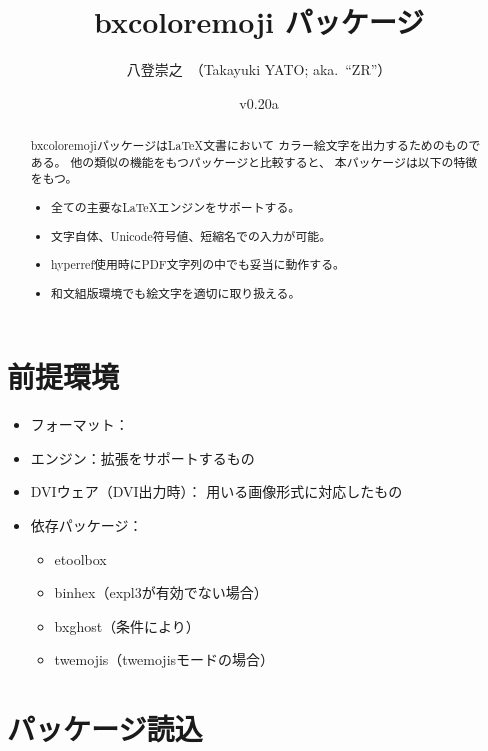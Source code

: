 \documentclass[a4paper]{ltjsarticle}
\newcommand{\PkgVersion}{0.20a}
\newcommand{\PkgDate}{2024/08/16}
\newcommand{\Pkg}[1]{\textsf{#1}}
\newcommand{\Means}{：\quad}
\newcommand{\／}{\mbox{}／\mbox{}}
\begin{document}
\title{\Pkg{bxcoloremoji} パッケージ}
\author{八登崇之\ （Takayuki YATO; aka.~“ZR”）}
\date{v\PkgVersion\quad[\PkgDate]}
\maketitle

\begin{abstract}
\Pkg{bxcoloremoji}パッケージは{\LaTeX}文書において
カラー絵文字を出力するためのものである。
他の類似の機能をもつパッケージと比較すると、
本パッケージは以下の特徴をもつ。
\begin{itemize}
\item 全ての主要な{\LaTeX}エンジンをサポートする。
\item 文字自体、Unicode符号値、短縮名での入力が可能。
\item \Pkg{hyperref}使用時にPDF文字列の中でも妥当に動作する。
\item 和文組版環境でも絵文字を適切に取り扱える。
\end{itemize}
\end{abstract}

\tableofcontents

\section{前提環境}
\label{sec:Prerequisites}

\begin{itemize}
\item フォーマット\Means {\LaTeX}
\item エンジン\Means {\eTeX}拡張をサポートするもの
\item DVIウェア（DVI出力時）\Means
  用いる画像形式に対応したもの
\item 依存パッケージ\Means
  \begin{itemize}
  \item \Pkg{etoolbox}
  \item \Pkg{binhex}（expl3が有効でない場合）
  \item \Pkg{bxghost}（条件により）
  \item \Pkg{twemojis}（twemojisモードの場合）
  \end{itemize}
\end{itemize}


\section{パッケージ読込}
\label{sec:Loading}
\end{document}
